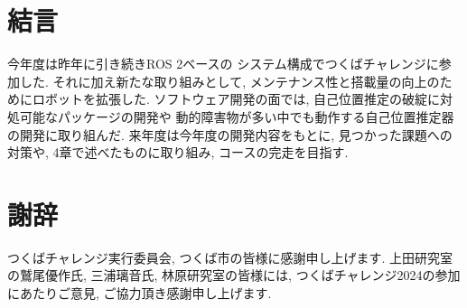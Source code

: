 \documentclass[twocolumn,9pt]{jsproceedings}
\begin{document}
\section{結言}
今年度は昨年に引き続きROS 2ベースの
システム構成でつくばチャレンジに参加した. 
それに加え新たな取り組みとして, 
メンテナンス性と搭載量の向上のためにロボットを拡張した. 
ソフトウェア開発の面では, 自己位置推定の破綻に対処可能なパッケージの開発や
動的障害物が多い中でも動作する自己位置推定器の開発に取り組んだ. 
来年度は今年度の開発内容をもとに, 見つかった課題への対策や, 
4章で述べたものに取り組み, 
コースの完走を目指す. 
%

\section*{謝辞}
つくばチャレンジ実行委員会, つくば市の皆様に感謝申し上げます. 
上田研究室の鷲尾優作氏, 三浦璃音氏, 
林原研究室の皆様には, つくばチャレンジ2024の参加にあたりご意見, ご協力頂き感謝申し上げます. 
\end{document}
